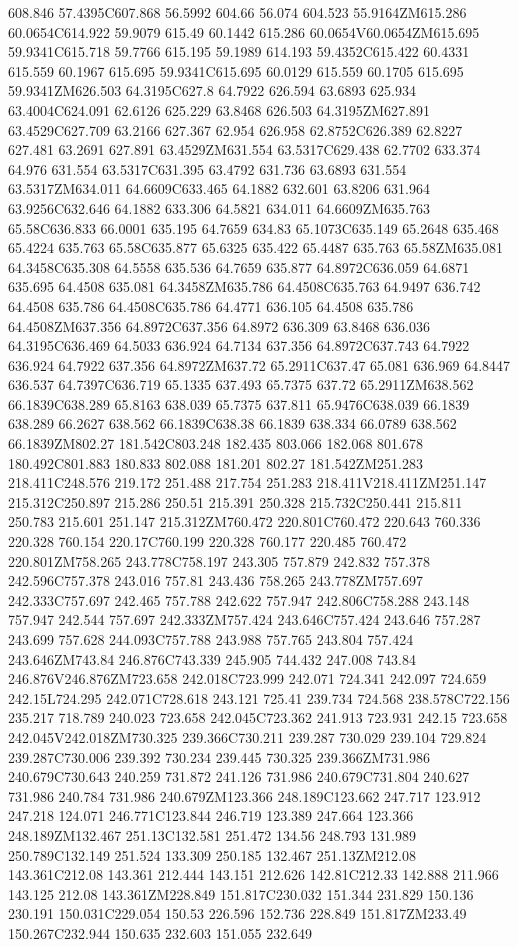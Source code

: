 608.846 57.4395C607.868 56.5992 604.66 56.074 604.523 55.9164ZM615.286 60.0654C614.922 59.9079 615.49 60.1442 615.286 60.0654V60.0654ZM615.695 59.9341C615.718 59.7766 615.195 59.1989 614.193 59.4352C615.422 60.4331 615.559 60.1967 615.695 59.9341C615.695 60.0129 615.559 60.1705 615.695 59.9341ZM626.503 64.3195C627.8 64.7922 626.594 63.6893 625.934 63.4004C624.091 62.6126 625.229 63.8468 626.503 64.3195ZM627.891 63.4529C627.709 63.2166 627.367 62.954 626.958 62.8752C626.389 62.8227 627.481 63.2691 627.891 63.4529ZM631.554 63.5317C629.438 62.7702 633.374 64.976 631.554 63.5317C631.395 63.4792 631.736 63.6893 631.554 63.5317ZM634.011 64.6609C633.465 64.1882 632.601 63.8206 631.964 63.9256C632.646 64.1882 633.306 64.5821 634.011 64.6609ZM635.763 65.58C636.833 66.0001 635.195 64.7659 634.83 65.1073C635.149 65.2648 635.468 65.4224 635.763 65.58C635.877 65.6325 635.422 65.4487 635.763 65.58ZM635.081 64.3458C635.308 64.5558 635.536 64.7659 635.877 64.8972C636.059 64.6871 635.695 64.4508 635.081 64.3458ZM635.786 64.4508C635.763 64.9497 636.742 64.4508 635.786 64.4508C635.786 64.4771 636.105 64.4508 635.786 64.4508ZM637.356 64.8972C637.356 64.8972 636.309 63.8468 636.036 64.3195C636.469 64.5033 636.924 64.7134 637.356 64.8972C637.743 64.7922 636.924 64.7922 637.356 64.8972ZM637.72 65.2911C637.47 65.081 636.969 64.8447 636.537 64.7397C636.719 65.1335 637.493 65.7375 637.72 65.2911ZM638.562 66.1839C638.289 65.8163 638.039 65.7375 637.811 65.9476C638.039 66.1839 638.289 66.2627 638.562 66.1839C638.38 66.1839 638.334 66.0789 638.562 66.1839ZM802.27 181.542C803.248 182.435 803.066 182.068 801.678 180.492C801.883 180.833 802.088 181.201 802.27 181.542ZM251.283 218.411C248.576 219.172 251.488 217.754 251.283 218.411V218.411ZM251.147 215.312C250.897 215.286 250.51 215.391 250.328 215.732C250.441 215.811 250.783 215.601 251.147 215.312ZM760.472 220.801C760.472 220.643 760.336 220.328 760.154 220.17C760.199 220.328 760.177 220.485 760.472 220.801ZM758.265 243.778C758.197 243.305 757.879 242.832 757.378 242.596C757.378 243.016 757.81 243.436 758.265 243.778ZM757.697 242.333C757.697 242.465 757.788 242.622 757.947 242.806C758.288 243.148 757.947 242.544 757.697 242.333ZM757.424 243.646C757.424 243.646 757.287 243.699 757.628 244.093C757.788 243.988 757.765 243.804 757.424 243.646ZM743.84 246.876C743.339 245.905 744.432 247.008 743.84 246.876V246.876ZM723.658 242.018C723.999 242.071 724.341 242.097 724.659 242.15L724.295 242.071C728.618 243.121 725.41 239.734 724.568 238.578C722.156 235.217 718.789 240.023 723.658 242.045C723.362 241.913 723.931 242.15 723.658 242.045V242.018ZM730.325 239.366C730.211 239.287 730.029 239.104 729.824 239.287C730.006 239.392 730.234 239.445 730.325 239.366ZM731.986 240.679C730.643 240.259 731.872 241.126 731.986 240.679C731.804 240.627 731.986 240.784 731.986 240.679ZM123.366 248.189C123.662 247.717 123.912 247.218 124.071 246.771C123.844 246.719 123.389 247.664 123.366 248.189ZM132.467 251.13C132.581 251.472 134.56 248.793 131.989 250.789C132.149 251.524 133.309 250.185 132.467 251.13ZM212.08 143.361C212.08 143.361 212.444 143.151 212.626 142.81C212.33 142.888 211.966 143.125 212.08 143.361ZM228.849 151.817C230.032 151.344 231.829 150.136 230.191 150.031C229.054 150.53 226.596 152.736 228.849 151.817ZM233.49 150.267C232.944 150.635 232.603 151.055 232.649 